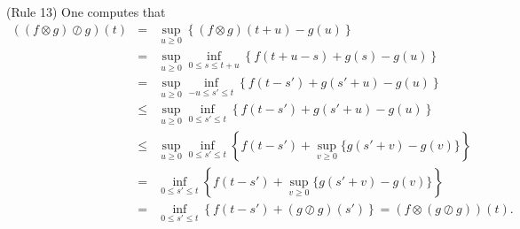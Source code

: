 \vspace{1ex}
\noindent
(Rule 13) One computes that
\begin{eqnarray*}
((f \otimes g) \oslash g)(t) & = & \sup_{u \geq 0}  \left\{ (f \otimes g)(t+u) - g(u) \right\} \\
            & = & \sup_{u \geq 0} \inf_{0 \leq s \leq t+u} \left\{ f(t+u-s) + g(s) - g(u) \right\} \\
            & = & \sup_{u \geq 0} \inf_{-u \leq s' \leq t} \left\{ f(t-s') + g(s'+u) - g(u) \right\} \\
            & \leq & \sup_{u \geq 0} \inf_{0 \leq s' \leq t} \left\{ f(t-s') + g(s'+u) - g(u) \right\} \\
            & \leq & \sup_{u \geq 0} \inf_{0 \leq s' \leq t} \left\{ f(t-s') + \sup_{v \geq 0} \{ g(s'+v) - g(v) \} \right\} \\
            & = & \inf_{0 \leq s' \leq t} \left\{ f(t-s') + \sup_{v \geq 0} \{ g(s'+v) - g(v) \} \right\} \\
            & = & \inf_{0 \leq s' \leq t} \left\{ f(t-s') + (g \oslash  g)(s') \right\} =
            (f \otimes (g \oslash g))(t) .
\end{eqnarray*}

